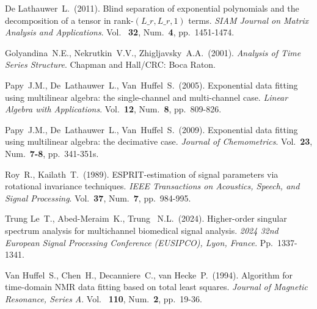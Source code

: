 \documentclass[12pt]{article}
\theoremstyle{definition}
\begin{document}
\begin{thebibliography}{10}

  De Lathauwer~L.~(2011). Blind separation of exponential polynomials
  and the decomposition of a tensor in rank-$(L\_r,L\_r,1)$ terms.
  {\sl SIAM Journal on Matrix Analysis and Applications}. Vol.~{\bf
  32}, Num.~{\bf 4},
  pp.~1451-1474.

  Golyandina~N.E., Nekrutkin~V.V., Zhigljavsky~A.A.~(2001).
  {\sl Analysis of Time Series Structure}.
  Chapman and Hall/CRC: Boca Raton.

  Papy~J.M., De~Lathauwer~L., Van~Huffel~S.~(2005).
  Exponential data fitting using multilinear algebra: the
  single-channel and multi-channel case.
  {\sl Linear Algebra with Applications}. Vol.~{\bf 12}, Num.~{\bf 8},
  pp.~809-826.

  Papy~J.M., De~Lathauwer~L., Van~Huffel~S.~(2009).
  Exponential data fitting using multilinear algebra: the decimative case.
  {\sl Journal of Chemometrics}. Vol.~{\bf 23}, Num.~{\bf 7-8},
  pp.~341-351s.

  Roy~R., Kailath~T.~(1989).
  ESPRIT-estimation of signal parameters via rotational invariance techniques.
  {\sl IEEE Transactions on Acoustics, Speech, and Signal Processing}.
  Vol.~{\bf 37}, Num.~{\bf 7},
  pp.~984-995.

  Trung Le~T., Abed-Meraim~K., Trung ~N.L.~(2024). Higher-order
  singular spectrum analysis for multichannel biomedical signal
  analysis. {\sl 2024 32nd European Signal Processing Conference
  (EUSIPCO), Lyon, France}. Pp.~1337-1341.

  Van Huffel~S., Chen~H., Decanniere~C., van Hecke~P.~(1994).
  Algorithm for time-domain {NMR} data fitting based on total least
  squares. {\sl Journal of Magnetic Resonance, Series A}. Vol.~{\bf
  110}, Num.~{\bf 2},
  pp.~19-36.


\end{thebibliography}
\end{document}
